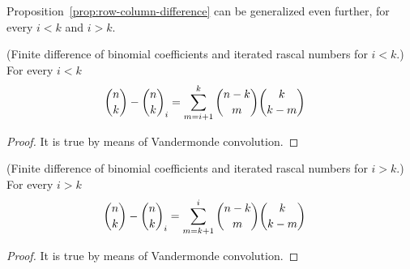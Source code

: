 Proposition~\eqref{prop:row-column-difference} can be generalized even further, for every $i<k$ and $i>k$.
\begin{proposition}
(Finite difference of binomial coefficients and iterated rascal numbers for $i<k$.)
    For every $i<k$
    \label{prop:row-column-difference-general}
    \begin{align*}
        \binom{n}{k} - \binom{n}{k}_{i} &= \sum_{m=i+1}^{k} \binom{n-k}{m} \binom{k}{k-m}
    \end{align*}
    \begin{proof}
        It is true by means of Vandermonde convolution.
    \end{proof}
\end{proposition}
\begin{proposition}
(Finite difference of binomial coefficients and iterated rascal numbers for $i>k$.)
    For every $i>k$
    \label{prop:row-column-difference-general-i-greater-k}
    \begin{align*}
        \binom{n}{k} - \binom{n}{k}_{i} &= \sum_{m=k+1}^{i} \binom{n-k}{m} \binom{k}{k-m}
    \end{align*}
    \begin{proof}
        It is true by means of Vandermonde convolution.
    \end{proof}
\end{proposition}
